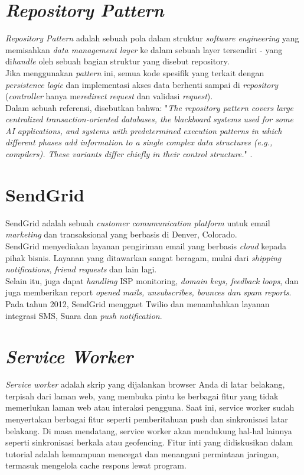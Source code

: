 	\section{\textit{Repository Pattern}}
	\textit{Repository Pattern} adalah sebuah pola dalam struktur \textit{software engineering} yang memisahkan \textit{data management layer} ke dalam sebuah layer tersendiri - yang di\textit{handle} oleh sebuah bagian struktur yang disebut repository. 
	\\ \indent
	Jika menggunakan \textit{pattern} ini, semua kode spesifik yang terkait dengan \textit{persistence logic} dan implementasi akses data berhenti sampai di \textit{repository} (\textit{controller} hanya me\textit{redirect} \textit{request} dan validasi \textit{request})\cite{noauthor_repository_2016}.
	\\ \indent
	Dalam sebuah referensi, disebutkan bahwa: "\textit{The repository pattern covers large centralized transaction-oriented databases, the blackboard systems used for some AI applications, and systems with predetermined execution patterns in which different phases add information to a single complex data structures (e.g., compilers). These variants differ chiefly in their control structure.}" \cite{shaw_patterns_1996}.
	
	\section{SendGrid}
	SendGrid adalah sebuah \textit{customer comumunication platform} untuk email \textit{marketing} dan transaksional yang berbasis di Denver, Colorado.
	\\ \indent
	SendGrid menyediakan layanan pengiriman email yang berbasis \textit{cloud} kepada pihak bisnis. Layanan yang ditawarkan sangat beragam, mulai dari \textit{shipping notifications}, \textit{friend requests} dan lain lagi. \\ \indent
	Selain itu, juga dapat \textit{handling} ISP monitoring, \textit{domain keys, feedback loops}, dan juga memberikan report \textit{opened mails, unsubscribes, bounces dan spam reports}. Pada tahun 2012, SendGrid menggaet Twilio dan menambahkan layanan integrasi SMS, Suara dan \textit{push notification}. \cite{wikipedia_sendgrid_2017}
	
	\section{\textit{Service Worker}}
	\textit{Service worker }adalah skrip yang dijalankan browser Anda di latar belakang, terpisah dari laman web, yang membuka pintu ke berbagai fitur yang tidak memerlukan laman web atau interaksi pengguna. Saat ini, service worker sudah menyertakan berbagai fitur seperti pemberitahuan push dan sinkronisasi latar belakang. Di masa mendatang, service worker akan mendukung hal-hal lainnya seperti sinkronisasi berkala atau geofencing. Fitur inti yang didiskusikan dalam tutorial adalah kemampuan mencegat dan menangani permintaan jaringan, termasuk mengelola cache respons lewat program\cite{google_developers_service_2017}.
	
